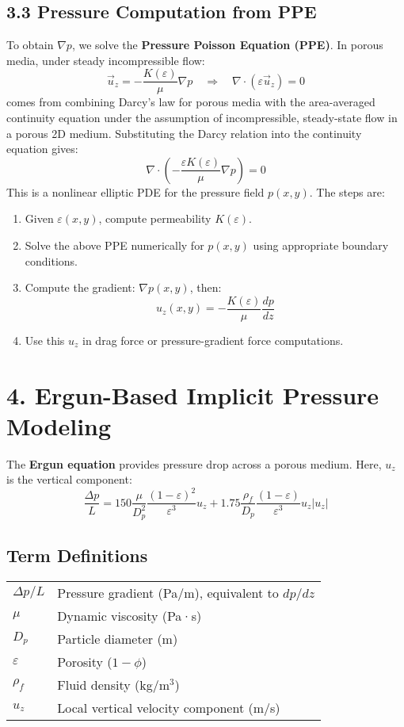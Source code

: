 \documentclass[12pt]{article}
\begin{document}
\subsection*{3.3 Pressure Computation from PPE}
To obtain \( \nabla p \), we solve the \textbf{Pressure Poisson Equation (PPE)}. In porous media, under steady incompressible flow:
\[
\vec{u}_z = -\frac{K(\varepsilon)}{\mu} \nabla p \quad \Rightarrow \quad \nabla \cdot (\varepsilon \vec{u}_z) = 0
\]
comes from combining Darcy's law for porous media with the area-averaged continuity equation under the assumption of incompressible, steady-state flow in a porous 2D medium. Substituting the Darcy relation into the continuity equation gives:
\[
\nabla \cdot \left( -\frac{\varepsilon K(\varepsilon)}{\mu} \nabla p \right) = 0
\]
This is a nonlinear elliptic PDE for the pressure field \( p(x, y) \). The steps are:
\begin{enumerate}
    \item Given \( \varepsilon(x, y) \), compute permeability \( K(\varepsilon) \).
    \item Solve the above PPE numerically for \( p(x, y) \) using appropriate boundary conditions.
    \item Compute the gradient: \( \nabla p(x, y) \), then:
    \[
    u_z(x, y) = -\frac{K(\varepsilon)}{\mu} \frac{dp}{dz}
    \]
    \item Use this \( u_z \) in drag force or pressure-gradient force computations.
\end{enumerate}

\section*{4. Ergun-Based Implicit Pressure Modeling}

The \textbf{Ergun equation} provides pressure drop across a porous medium. Here, \( u_z \) is the vertical component:
\[
\boxed{ \frac{\Delta p}{L} = 150 \frac{\mu}{D_p^2} \frac{(1 - \varepsilon)^2}{\varepsilon^3} u_z + 1.75 \frac{\rho_f}{D_p} \frac{(1 - \varepsilon)}{\varepsilon^3} u_z |u_z| }
\]

\subsection*{Term Definitions}
\begin{center}
\begin{tabular}{ll}
\( \Delta p / L \) & Pressure gradient (Pa/m), equivalent to \( dp/dz \) \\
\( \mu \) & Dynamic viscosity (Pa·s) \\
\( D_p \) & Particle diameter (m) \\
\( \varepsilon \) & Porosity (\( 1 - \phi \)) \\
\( \rho_f \) & Fluid density (kg/m\(^3\)) \\
\( u_z \) & Local vertical velocity component (m/s) \\
\end{tabular}
\end{center}
\end{document}
